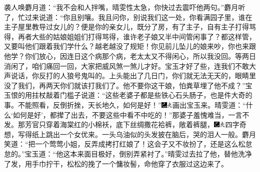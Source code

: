 袭人唤麝月道：``我不会和人拌嘴，晴雯性太急，你快过去震吓他两句。''麝月听了，忙过来说道：``你且别嚷。我且问你，别说我们这一处，你看满园子里，谁在主子屋里教导过女儿的？便是你的亲女儿，既分了房，有了主子，自有主子打得骂得，再者大些的姑娘姐姐们打得骂得，谁许老子娘又半中间管闲事了？都这样管，又要叫他们跟着我们学什么？越老越没了规矩！你见前儿坠儿的娘来吵，你也来跟他学？你们放心，因连日这个病那个病，老太太又不得闲心，所以我没回。等两日消闲了，咱们痛回一回，大家把威风煞一煞儿才好。宝玉才好了些，连我们不敢大声说话，你反打的人狼号鬼叫的。上头能出了几日门，你们就无法无天的，眼睛里没了我们，再两天你们就该打我们了。他不要你这干娘，怕粪草埋了他不成？''宝玉恨的用拄杖敲着门槛子说道：``这些老婆子都是些铁心石头肠子，也是件大奇的事。不能照看，反倒折挫，天长地久，如何是好！''{\includegraphics[width=3mm]{../Images/00003}\includegraphics[width=3mm]{../Images/00012}\footnotesize \kaishu 画出宝玉来。}晴雯道：``什么`如何是好'，都撵了出去，不要这些中看不中吃的！''那婆子羞愧难当，一言不发。那芳官只穿着海棠红的小棉袄，底下丝绸撒花袷裤，敞着裤腿，{\includegraphics[width=3mm]{../Images/00003}\includegraphics[width=3mm]{../Images/00012}\footnotesize \kaishu 四字奇想，写得纸上跳出一个女优来。}一头乌油似的头发披在脑后，哭的泪人一般。麝月笑道：``把一个莺莺小姐，反弄成拷打红娘了！这会子又不妆扮了，还是这么松怠怠的。''宝玉道：``他这本来面目极好，倒别弄紧衬了。''晴雯过去拉了他，替他洗净了发，用手巾拧干，松松的挽了一个慵妆髻，命他穿了衣服过这边来了。

